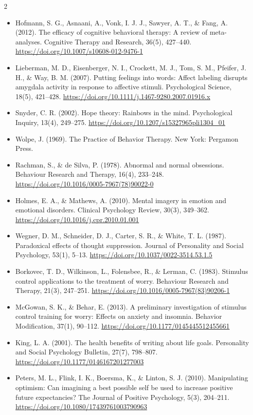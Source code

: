 \documentclass[10pt]{article}
\theoremstyle{definition}
\theoremstyle{remark}
\begin{document}
\begin{multicols}{2}
\begin{itemize}[leftmargin=1em,itemsep=0pt,topsep=1pt,parsep=0pt]
\item Hofmann, S. G., Asnaani, A., Vonk, I. J. J., Sawyer, A. T., \& Fang, A. (2012). The efficacy of cognitive behavioral therapy: A review of meta-analyses. Cognitive Therapy and Research, 36(5), 427--440. \url{https://doi.org/10.1007/s10608-012-9476-1}
\item Lieberman, M. D., Eisenberger, N. I., Crockett, M. J., Tom, S. M., Pfeifer, J. H., \& Way, B. M. (2007). Putting feelings into words: Affect labeling disrupts amygdala activity in response to affective stimuli. Psychological Science, 18(5), 421--428. \url{https://doi.org/10.1111/j.1467-9280.2007.01916.x}
\item Snyder, C. R. (2002). Hope theory: Rainbows in the mind. Psychological Inquiry, 13(4), 249--275. \url{https://doi.org/10.1207/s15327965pli1304_01}
\item Wolpe, J. (1969). The Practice of Behavior Therapy. New York: Pergamon Press.
\item Rachman, S., \& de Silva, P. (1978). Abnormal and normal obsessions. Behaviour Research and Therapy, 16(4), 233--248. \url{https://doi.org/10.1016/0005-7967(78)90022-0}
\item Holmes, E. A., \& Mathews, A. (2010). Mental imagery in emotion and emotional disorders. Clinical Psychology Review, 30(3), 349--362. \url{https://doi.org/10.1016/j.cpr.2010.01.001}
\item Wegner, D. M., Schneider, D. J., Carter, S. R., \& White, T. L. (1987). Paradoxical effects of thought suppression. Journal of Personality and Social Psychology, 53(1), 5--13. \url{https://doi.org/10.1037/0022-3514.53.1.5}
\item Borkovec, T. D., Wilkinson, L., Folensbee, R., \& Lerman, C. (1983). Stimulus control applications to the treatment of worry. Behaviour Research and Therapy, 21(3), 247--251. \url{https://doi.org/10.1016/0005-7967(83)90206-1}
\item McGowan, S. K., \& Behar, E. (2013). A preliminary investigation of stimulus control training for worry: Effects on anxiety and insomnia. Behavior Modification, 37(1), 90--112. \url{https://doi.org/10.1177/0145445512455661}
\item King, L. A. (2001). The health benefits of writing about life goals. Personality and Social Psychology Bulletin, 27(7), 798--807. \url{https://doi.org/10.1177/0146167201277003}
\item Peters, M. L., Flink, I. K., Boersma, K., \& Linton, S. J. (2010). Manipulating optimism: Can imagining a best possible self be used to increase positive future expectancies? The Journal of Positive Psychology, 5(3), 204--211. \url{https://doi.org/10.1080/17439761003790963}

\end{itemize}
\end{multicols}
\end{document}
